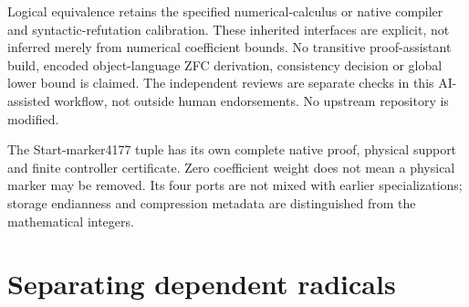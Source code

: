 \documentclass[11pt]{article}
\theoremstyle{definition}\newtheorem{definition}[theorem]{Definition}
\theoremstyle{remark}\newtheorem{remark}[theorem]{Remark}
\begin{document}
Logical equivalence retains the specified numerical-calculus or native
compiler and syntactic-refutation calibration. These inherited interfaces
are explicit, not inferred merely from numerical coefficient bounds. No
transitive proof-assistant build, encoded object-language ZFC derivation,
consistency decision or global lower bound is claimed. The independent
reviews are separate checks in this AI-assisted workflow, not outside
human endorsements. No upstream repository is modified.

The Start-marker4177 tuple has its own complete native proof, physical
support and finite controller certificate. Zero coefficient weight does
not mean a physical marker may be removed. Its four ports are not mixed
with earlier specializations; storage endianness and compression metadata
are distinguished from the mathematical integers.
\appendix
\section{Separating dependent radicals}



\end{document}
